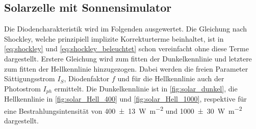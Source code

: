 \documentclass[english, ngerman]{scrartcl}
\begin{document}
\subsection{Solarzelle mit Sonnensimulator}
\label{subsec:auswertung_solar_sonnensimulator}

Die Diodencharakteristik wird im Folgenden ausgewertet. Die Gleichung nach Shockley, welche prinzipiell implizite Korrekturterme beinhaltet, ist in \autoref{eq:shockley} und \autoref{eq:shockley_beleuchtet} schon vereinfacht ohne diese Terme dargestellt. Erstere Gleichung wird zum fitten der Dunkelkennlinie und letztere zum fitten der Hellkennlinie hinzugezogen. Dabei werden die freien Parameter Sättigungsstrom $I_S$, Diodenfaktor $f$ und für die Hellkennlinie auch der Photostrom $I_{ph}$ ermittelt. Die Dunkelkennlinie ist in \autoref{fig:solar_dunkel}, die Hellkennlinie in \autoref{fig:solar_Hell_400} und \autoref{fig:solar_Hell_1000}, respektive für eine Bestrahlungsintensität von \SI{400(13)}{\watt\per\meter\squared} und \SI{1000(30)}{\watt\per\meter\squared} dargestellt.
%
\setcapindent{0pt}
\end{document}
